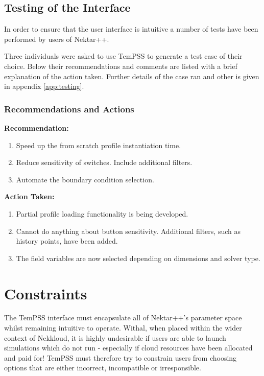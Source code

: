 \documentclass[11pt, a4paper]{report}
\begin{document}
\section{Testing of the Interface}
In order to ensure that the user interface is intuitive a number of tests have been performed by users of Nektar++.

Three individuals were asked to use TemPSS to generate a test case of their choice. Below their recommendations and comments are listed with a brief explanation of the action taken. Further details of the case ran and other is given in appendix \ref{app:testing}.

\subsection{Recommendations and Actions}
\begin{multicols}{2}

\textbf{Recommendation:}
\begin{enumerate}
\item Speed up the from scratch profile instantiation time.
\item Reduce sensitivity of switches. Include additional filters.\\ 
\item Automate the boundary condition selection.\\
\end{enumerate}

\columnbreak

\textbf{Action Taken:}
\begin{enumerate}
\item Partial profile loading functionality is being developed.
\item Cannot do anything about button sensitivity. Additional filters, such as history points, have been added.
\item The field variables are now selected depending on dimensions and solver type.
\end{enumerate}

\end{multicols}

\chapter{Constraints}
\label{sec:constraints}
The TemPSS interface must encapsulate all of Nektar++'s parameter space whilst remaining intuitive to operate. Withal, when placed within the wider context of Nekkloud, it is highly undesirable if users are able to launch simulations which do not run - especially if cloud resources have been allocated and paid for! TemPSS must therefore try to constrain users from choosing options that are either incorrect, incompatible or irresponsible.
\end{document}
